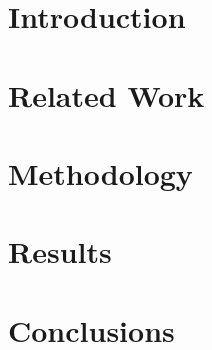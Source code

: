 \documentclass{thesis}
\begin{document}
\maketitle





\thesisTables
\thesisBodyStart

\chapter{Introduction}


\chapter{Related Work}


\chapter{Methodology}


\chapter{Results}


\chapter{Conclusions}


\printReferences
\thesisTOT
\thesisTOF
\end{document}
